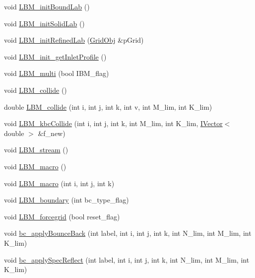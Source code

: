 \begin{DoxyCompactItemize}
\item 
void \hyperlink{class_grid_obj_a4b6edceeda49496365e725eb67931961}{L\+B\+M\+\_\+init\+Bound\+Lab} ()
\item 
void \hyperlink{class_grid_obj_a5dd08730d7cdea576bb4b337786a9bcf}{L\+B\+M\+\_\+init\+Solid\+Lab} ()
\item 
void \hyperlink{class_grid_obj_a3ba133d06625fb576ca0909b946033b2}{L\+B\+M\+\_\+init\+Refined\+Lab} (\hyperlink{class_grid_obj}{Grid\+Obj} \&p\+Grid)
\item 
void \hyperlink{class_grid_obj_a023713976673d029103690a91c5415f9}{L\+B\+M\+\_\+init\+\_\+get\+Inlet\+Profile} ()
\item 
void \hyperlink{class_grid_obj_af9f81ad6b70fb16997ef88f0c19de5b8}{L\+B\+M\+\_\+multi} (bool I\+B\+M\+\_\+flag)
\item 
void \hyperlink{class_grid_obj_a0feb0f9406f626e90c57045350161b22}{L\+B\+M\+\_\+collide} ()
\item 
double \hyperlink{class_grid_obj_ab24eba4c29917ea98cc48b53c2a03a25}{L\+B\+M\+\_\+collide} (int i, int j, int k, int v, int M\+\_\+lim, int K\+\_\+lim)
\item 
void \hyperlink{class_grid_obj_a9f98bf9f34b1b1f2fb31a25fb3061f49}{L\+B\+M\+\_\+kbc\+Collide} (int i, int j, int k, int M\+\_\+lim, int K\+\_\+lim, \hyperlink{class_i_vector}{I\+Vector}$<$ double $>$ \&f\+\_\+new)
\item 
void \hyperlink{class_grid_obj_a5b5cb1f3136da8cbff96955d9c6d9e5b}{L\+B\+M\+\_\+stream} ()
\item 
void \hyperlink{class_grid_obj_a25382158b7747da7c0639aed513ae39c}{L\+B\+M\+\_\+macro} ()
\item 
void \hyperlink{class_grid_obj_ab69942450175d12c75f4b8d33b06c905}{L\+B\+M\+\_\+macro} (int i, int j, int k)
\item 
void \hyperlink{class_grid_obj_a23d89d6111dd46653b2b1f79a5c7fbf1}{L\+B\+M\+\_\+boundary} (int bc\+\_\+type\+\_\+flag)
\item 
void \hyperlink{class_grid_obj_a884b3fc103cf8035438ea8f144bff5bb}{L\+B\+M\+\_\+forcegrid} (bool reset\+\_\+flag)
\item 
void \hyperlink{class_grid_obj_ae10eccc72ee3ef9a9bb730f548b55c89}{bc\+\_\+apply\+Bounce\+Back} (int label, int i, int j, int k, int N\+\_\+lim, int M\+\_\+lim, int K\+\_\+lim)
\item 
void \hyperlink{class_grid_obj_aa91e3f8ae700ac9525f0ad063b1da084}{bc\+\_\+apply\+Spec\+Reflect} (int label, int i, int j, int k, int N\+\_\+lim, int M\+\_\+lim, int K\+\_\+lim)

\end{DoxyCompactItemize}
